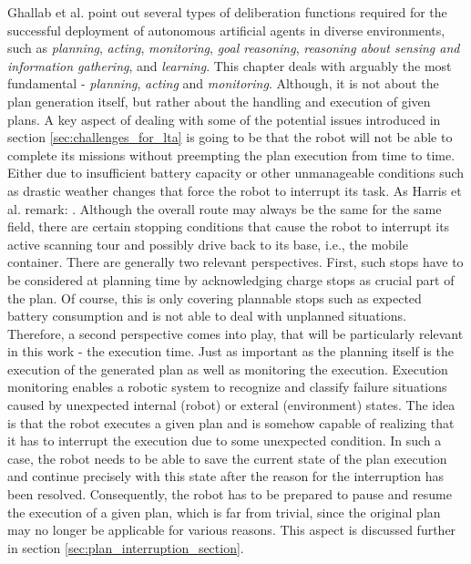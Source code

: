 \documentclass[english, master, utf8]{base/thesis_KBS}
\begin{document}
Ghallab et al. point out several types of deliberation functions required for the successful deployment of autonomous artificial agents in diverse environments,
such as \textit{planning}, \textit{acting}, \textit{monitoring}, \textit{goal reasoning}, \textit{reasoning about sensing and information gathering}, and \textit{learning}. \cite{GNT:2016} This chapter deals with arguably the most
fundamental - \textit{planning}, \textit{acting} and \textit{monitoring}. Although, it is not about the plan generation itself, but rather about the handling and execution of given plans.
A key aspect of dealing with some of the potential issues introduced in section \ref{sec:challenges_for_lta} is going to be that the robot will not be able to
complete its missions without preempting the plan execution from time to time. Either due to insufficient battery capacity or other unmanageable conditions such as 
drastic weather changes that force the robot to interrupt its task. As Harris et al. remark: . \cite{Harris:2021} Although the overall route may always be the same for the same field, there are certain stopping
conditions that cause the robot to interrupt its active scanning tour and possibly drive back to its base, i.e., the mobile container.
There are generally two relevant perspectives. First, such stops have to be considered at planning time by acknowledging charge stops as crucial part of the plan.
Of course, this is only covering plannable stops such as expected battery consumption and is not able to deal with unplanned situations.
Therefore, a second perspective comes into play, that will be particularly relevant in this work - the execution time.
Just as important as the planning itself is the execution of the generated plan as well as monitoring the execution. Execution monitoring enables a robotic system to
recognize and classify failure situations caused by unexpected internal (robot) or exteral (environment) states. \cite{Pettersson:2005}
The idea is that the robot executes a given plan and is somehow capable of realizing that it has to interrupt the execution due to some unexpected condition.
In such a case, the robot needs to be able to save the current state of the plan execution and continue precisely with this state after the reason 
for the interruption has been resolved. Consequently, the robot has to be prepared to pause and resume the execution of a given plan, which is far from 
trivial, since the original plan may no longer be applicable for various reasons. This aspect is discussed further in section \ref{sec:plan_interruption_section}.
\end{document}
